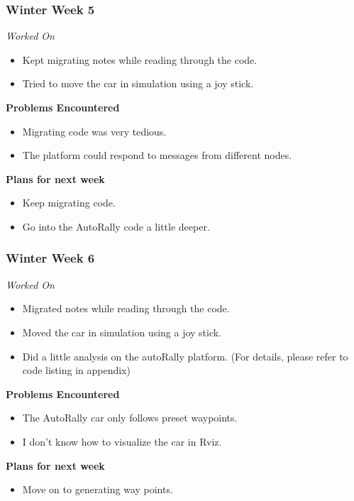 \documentclass[compsoc,draftclsnofoot,onecolumn,10pt]{IEEEtran}
\begin{document}
\subsubsection*{Winter Week 5}
\textit{Worked On}
\begin{itemize}
    \item Kept migrating notes while reading through the code.
    \item Tried to move the car in simulation using a joy stick.
\end{itemize}
\textbf{Problems Encountered}
\begin{itemize}
  \item Migrating code was very tedious.
  \item The platform could respond to messages from different nodes.
\end{itemize}
\textbf{Plans for next week}
\begin{itemize}
  \item Keep migrating code.
  \item Go into the AutoRally code a little deeper.
\end{itemize}



\subsubsection*{Winter Week 6}
\textit{Worked On}
\begin{itemize}
    \item Migrated notes while reading through the code.
    \item Moved the car in simulation using a joy stick.
    \item Did a little analysis on the autoRally platform. (For details, please refer to code listing in appendix)
\end{itemize}
\textbf{Problems Encountered}
\begin{itemize}
  \item The AutoRally car only follows preset waypoints.
  \item I don't know how to visualize the car in Rviz.
\end{itemize}
\textbf{Plans for next week}
\begin{itemize}
  \item Move on to generating way points.
\end{itemize}
\end{document}
